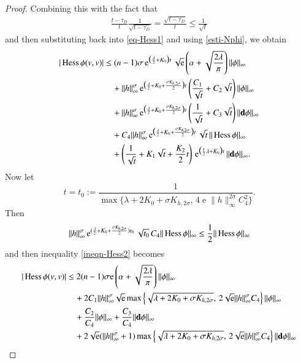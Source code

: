 \documentclass[11pt,reqno]{amsart}
\theoremstyle{definition} \newtheorem{remark}[theorem]{Remark}
\numberwithin{equation}{section}
\newcommand\1{\mathbbm{1}}
\def\bd{{\bf d}}
\def\r{\right}
\def\l{\left} \def\e{\operatorname{e}} \def\dsum{\displaystyle\sum}
\begin{document}
\begin{proof}
Combining this with
the fact that
\begin{align*}
\frac{t-\tau_D}{t}\frac{1}{\sqrt{t-\tau_D}}= \frac{\sqrt{t-\tau_D}}{t}\leq \frac{1}{\sqrt{t}}
\end{align*}
 and then substituting back into \eqref{eq-Hess1} and using \eqref{esti-Nphi},  we obtain 
\begin{align}\label{ineqn-Hess2}
  |\Hess \phi (v,v)|&\leq  (n-1)\sigma \e^{\big(\frac{\lambda}{2}+K_0\big)t} \sqrt{\e}  \l(\alpha+\sqrt{\frac{2\lambda}{\pi}}\r)\|\phi\|_{\infty} \notag\\
   & \quad  + \|h\|_{\infty}^{\sigma}\e^{\big(\frac{\lambda}{2}+K_0+\frac{\sigma K_{h,2\sigma}}{2}\big)t}\l(\frac{C_1}{\sqrt{t}}+ C_2\sqrt{t}\r)\|\phi\|_{\infty} \notag \\
   & \quad  + \|h\|_{\infty}^{\sigma}\e^{\big(\frac{\lambda}{2}+K_0+\frac{\sigma K_{h,2\sigma}}{2}\big)t}\l(\frac{1}{\sqrt{t}}+ C_3\sqrt{t}\r)\|\bd \phi\|_{\infty} \notag \\
 & \quad   +C_4\|h\|^{\sigma}_{\infty}\e^{\big(\frac{\lambda}{2}+K_0+\frac{\sigma K_{h,2\sigma}}{2}\big)t}\sqrt{t}\,\|\Hess \phi\|_{\infty} \notag \\
  &\quad + \l(\frac{1}{\sqrt{t}}+K_1\sqrt{t}+\frac{K_2}{2}t\r)
    \,\e^{\big(\frac12\lambda+K_0\big)t} \|\bd \phi\|_{\infty}.
\end{align}
Now let $$t=t_0:=\frac{1}{\max\big\{\lambda+2K_0+\sigma K_{h,2\sigma},\, 4\e\|h\|_{\infty}^{2\sigma}C_4^2\big\}}.$$ Then 
\begin{align*}
\|h\|_{\infty}^{\sigma}\e^{(\frac{\lambda}{2}+K_0+\frac{\sigma K_{h,2\sigma}}{2})t_0}\sqrt{t_0}\,C_4\|\Hess \phi\|_{\infty}\leq \frac{1}{2}\|\Hess \phi\|_{\infty}
\end{align*}
and then inequality \eqref{ineqn-Hess2} becomes
\begin{align}\label{Hess-phi1}
  |\Hess \phi (v,v)| 
&\leq 2(n-1)\sigma {\e} \l(\alpha+\sqrt{\frac{2\lambda}{\pi}}\r)\|\phi\|_{\infty}\notag\\
&\quad +2C_1\|h\|_{\infty}^{\sigma}\sqrt{\e} \max \l\{\sqrt{\lambda+2K_0+\sigma K_{h,2\sigma}},\, 2\sqrt{\e}\|h\|_{\infty}^{\sigma}C_4\r\}\|\phi\|_{\infty}\notag \\
&\quad + \frac{C_2}{C_4} \|\phi\|_{\infty}+\frac{C_3}{C_4} \|\bd \phi\|_{\infty} \notag\\
&\quad + 2\sqrt{\e}(\|h\|_{\infty}^{\sigma} +1) \max \l\{\sqrt{\lambda+2K_0+\sigma K_{h,2\sigma}},\, 2\sqrt{\e}\|h\|_{\infty}^{\sigma}C_4\r\} \|\bd \phi\|_{\infty}\notag\\

\end{align}
\end{proof}
\end{document}
